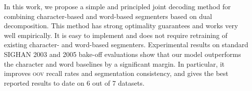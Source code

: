 
In this work, we propose a simple and principled joint decoding method for combining character-based and word-based segmenters based on dual decomposition. This method has strong optimality guarantees and works very well empirically. It is easy to implement and does not require retraining of existing character- and word-based segmenters.
Experimental results on standard SIGHAN 2003 and 2005 bake-off evaluations show that our model outperforms the character and word baselines by a significant margin.
In particular, it improves \textsc{oov} recall rates and segmentation consistency, %
and gives the best reported results to date on 6 out of 7 datasets.